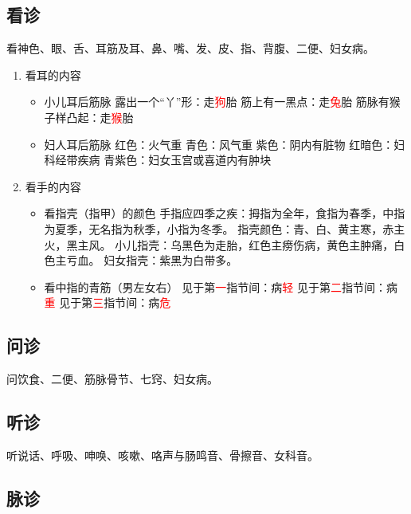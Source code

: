 \documentclass[cn,hazy,blue,12pt,normal,founder]{elegantnote}
\newcommand{\redt}[1]{\textcolor{red}{{}#1}}      %
\begin{document}

\subsection{看诊}

看神色、眼、舌、耳筋及耳、鼻、嘴、发、皮、指、背腹、二便、妇女病。

\begin{enumerate}
  \item 看耳的内容
  \begin{itemize}
    \item 小儿耳后筋脉
    \subitem 露出一个“丫”形：走\redt{狗}胎
    \subitem 筋上有一黑点：走\redt{兔}胎
    \subitem 筋脉有猴子样凸起：走\redt{猴}胎
    \item 妇人耳后筋脉
    \subitem 红色：火气重
    \subitem 青色：风气重
    \subitem 紫色：阴内有脏物
    \subitem 红暗色：妇科经带疾病
    \subitem 青紫色：妇女玉宫或喜道内有肿块
  \end{itemize}
  \item 看手的内容
  \begin{itemize}
    \item 看指壳（指甲）的颜色
    \subitem 手指应四季之疾：拇指为全年，食指为春季，中指为夏季，无名指为秋季，小指为冬季。
    \subitem 指壳颜色：青、白、黄主寒，赤主火，黑主风。
    \subitem 小儿指壳：乌黑色为走胎，红色主痨伤病，黄色主肿痛，白色主亏血。
    \subitem 妇女指壳：紫黑为白带多。
    \item 看中指的青筋（男左女右）
    \subitem 见于第\redt{一}指节间：病\redt{轻}
    \subitem 见于第\redt{二}指节间：病\redt{重}
    \subitem 见于第\redt{三}指节间：病\redt{危}
  \end{itemize}
\end{enumerate}

\subsection{问诊}

问饮食、二便、筋脉骨节、七窍、妇女病。

\subsection{听诊}

听说话、呼吸、呻唤、咳嗽、咯声与肠鸣音、骨擦音、女科音。

\subsection{脉诊}
\end{document}
